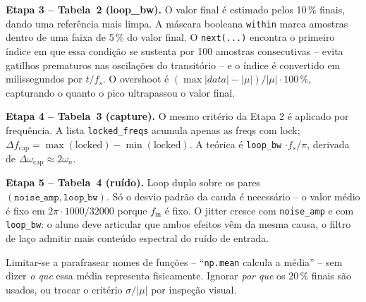 \documentclass[11pt,a4paper]{article}
\begin{document}
\textbf{Etapa 3 -- Tabela~2 (loop\_bw).} O valor final é estimado pelos 10\,\%
finais, dando uma referência mais limpa. A máscara booleana \texttt{within} marca
amostras dentro de uma faixa de 5\,\% do valor final. O \texttt{next(...)} encontra
o primeiro índice em que essa condição se sustenta por 100 amostras consecutivas
-- evita gatilhos prematuros nas oscilações do transitório -- e o índice é
convertido em milissegundos por $t/f_s$. O overshoot é
$(\max|data| - |\mu|)/|\mu| \cdot 100\,\%$, capturando o quanto o pico
ultrapassou o valor final.

\textbf{Etapa 4 -- Tabela~3 (capture).} O mesmo critério da Etapa 2 é aplicado
por frequência. A lista \texttt{locked\_freqs} acumula apenas as freqs com lock;
$\Delta f_\text{cap} = \max(\text{locked}) - \min(\text{locked})$. A teórica é
\texttt{loop\_bw} $\cdot f_s/\pi$, derivada de
$\Delta\omega_\text{cap} \approx 2\omega_n$.

\textbf{Etapa 5 -- Tabela~4 (ruído).} Loop duplo sobre os pares
$(\texttt{noise\_amp}, \texttt{loop\_bw})$. Só o desvio padrão da cauda é
necessário -- o valor médio é fixo em $2\pi \cdot 1000/32000$ porque
$f_\text{in}$ é fixo. O jitter cresce com \texttt{noise\_amp} e com
\texttt{loop\_bw}: o aluno deve articular que ambos efeitos vêm da mesma causa,
o filtro de laço admitir mais conteúdo espectral do ruído de entrada.

\begin{nota}
Limitar-se a parafrasear nomes de funções -- ``\texttt{np.mean} calcula a média''
-- sem dizer \emph{o que} essa média representa fisicamente. Ignorar
\emph{por que} os 20\,\% finais são usados, ou trocar o critério
$\sigma/|\mu|$ por inspeção visual.
\end{nota}
\end{document}
